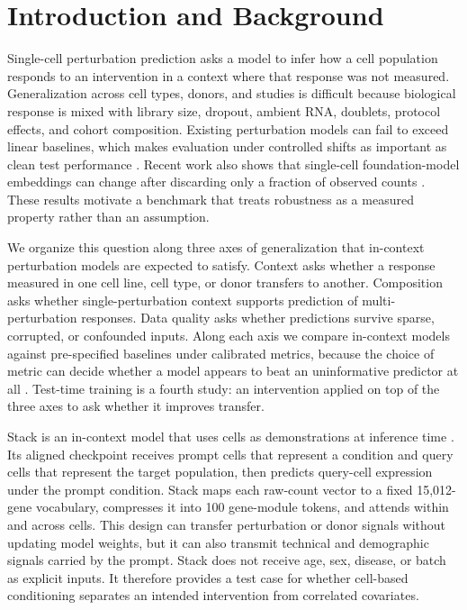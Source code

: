 \documentclass[times, twoside, watermark]{zHenriquesLab-StyleBioRxiv}
\begin{document}

\setlength\parindent{12pt}


\section*{Introduction and Background}

Single-cell perturbation prediction asks a model to infer how a cell population responds to an intervention in a context where that response was not measured. Generalization across cell types, donors, and studies is difficult because biological response is mixed with library size, dropout, ambient RNA, doublets, protocol effects, and cohort composition. Existing perturbation models can fail to exceed linear baselines, which makes evaluation under controlled shifts as important as clean test performance \cite{ahlmann2025linear}. Recent work also shows that single-cell foundation-model embeddings can change after discarding only a fraction of observed counts \cite{sallam2026nuisance}. These results motivate a benchmark that treats robustness as a measured property rather than an assumption.

We organize this question along three axes of generalization that in-context perturbation models are expected to satisfy. Context asks whether a response measured in one cell line, cell type, or donor transfers to another. Composition asks whether single-perturbation context supports prediction of multi-perturbation responses. Data quality asks whether predictions survive sparse, corrupted, or confounded inputs. Along each axis we compare in-context models against pre-specified baselines under calibrated metrics, because the choice of metric can decide whether a model appears to beat an uninformative predictor at all \cite{miller2026calibrated}. Test-time training is a fourth study: an intervention applied on top of the three axes to ask whether it improves transfer.

Stack is an in-context model that uses cells as demonstrations at inference time \cite{dong2026stack}. Its aligned checkpoint receives prompt cells that represent a condition and query cells that represent the target population, then predicts query-cell expression under the prompt condition. Stack maps each raw-count vector to a fixed 15,012-gene vocabulary, compresses it into 100 gene-module tokens, and attends within and across cells. This design can transfer perturbation or donor signals without updating model weights, but it can also transmit technical and demographic signals carried by the prompt. Stack does not receive age, sex, disease, or batch as explicit inputs. It therefore provides a test case for whether cell-based conditioning separates an intended intervention from correlated covariates.
\end{document}
